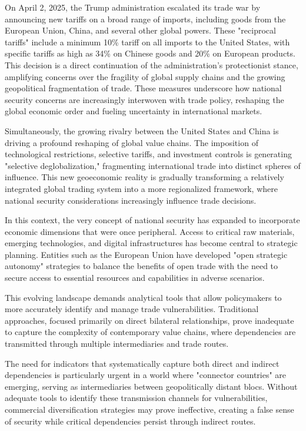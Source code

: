 \documentclass[final,1p,times,authoryear]{elsarticle}
\begin{document}
On April 2, 2025, the Trump administration escalated its trade war by announcing new tariffs on a broad range of imports, including goods from the European Union, China, and several other global powers. These "reciprocal tariffs" include a minimum 10\% tariff on all imports to the United States, with specific tariffs as high as 34\% on Chinese goods and 20\% on European products. This decision is a direct continuation of the administration’s protectionist stance, amplifying concerns over the fragility of global supply chains and the growing geopolitical fragmentation of trade. These measures underscore how national security concerns are increasingly interwoven with trade policy, reshaping the global economic order and fueling uncertainty in international markets.

Simultaneously, the growing rivalry between the United States and China is driving a profound reshaping of global value chains. The imposition of technological restrictions, selective tariffs, and investment controls is generating "selective deglobalization," fragmenting international trade into distinct spheres of influence. This new geoeconomic reality is gradually transforming a relatively integrated global trading system into a more regionalized framework, where national security considerations increasingly influence trade decisions.

In this context, the very concept of national security has expanded to incorporate economic dimensions that were once peripheral. Access to critical raw materials, emerging technologies, and digital infrastructures has become central to strategic planning. Entities such as the European Union have developed "open strategic autonomy" strategies to balance the benefits of open trade with the need to secure access to essential resources and capabilities in adverse scenarios.

This evolving landscape demands analytical tools that allow policymakers to more accurately identify and manage trade vulnerabilities. Traditional approaches, focused primarily on direct bilateral relationships, prove inadequate to capture the complexity of contemporary value chains, where dependencies are transmitted through multiple intermediaries and trade routes.

The need for indicators that systematically capture both direct and indirect dependencies is particularly urgent in a world where "connector countries" are emerging, serving as intermediaries between geopolitically distant blocs. Without adequate tools to identify these transmission channels for vulnerabilities, commercial diversification strategies may prove ineffective, creating a false sense of security while critical dependencies persist through indirect routes.
\end{document}
